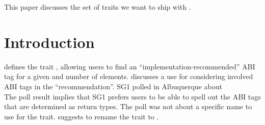 \newcommand\wgTitle{Finding the right set of traits for \code{simd<T>}}
\newcommand\wgName{Matthias Kretz <m.kretz@gsi.de>}
\newcommand\wgDocumentNumber{P0964R0}
\newcommand\wgGroup{SG1, LEWG}

\usepackage{mymacros}
\usepackage{wg21}
\usepackage{underscore}



\newcommand\simd[1][]{\type{simd#1}\xspace}
\newcommand\simdT{\type{simd<T>}\xspace}
\newcommand\valuetype{\type{value\_type}\xspace}
\newcommand\referencetype{\type{reference}\xspace}
\newcommand\whereexpression{\type{where\_expression}\xspace}
\newcommand\simdcast{\code{simd\_cast}\xspace}
\newcommand\mask[1][]{\type{simd\_mask#1}\xspace}
\newcommand\maskT{\type{simd\_mask<T>}\xspace}
\newcommand\fixedsizeN{\type{simd\_abi::fixed\_size<N>}\xspace}
\newcommand\fixedsizescoped{\type{simd\_abi::fixed\_size}\xspace}
\newcommand\fixedsize{\type{fixed\_size}\xspace}
\newcommand\simdEP{\code{execution::}\type{simd}\xspace}
\newcommand\seqEP{\code{execution::}\type{seq}\xspace}
\newcommand\realArithmeticType{vectorizable type\xspace}

\usepackage{pifont}

\newcommand\foralli[1][]{for all \code i $\in$ \code{[0, #1size())}\xspace}
\newcommand\forallmaskedi[1]{%
  for all \code i
  $\in \{j \in \mathbb{N}_0 | j < \code{size()} ⋀ \code{#1[}j\code{]}\}$%
  \xspace%
}
\newcommand\chck{\item[\color{black}\ensuremath{\checkmark}]}
\newcommand\todo{\item[\color{black}\ding{46}] \color{gray}}
\newcommand\itemheader[1]{\item[] \hfill \textcolor{gray}{\textsc{#1}}}


\begin{wgTitlepage}
  This paper discusses the set of traits we want to ship with \simdT.
\end{wgTitlepage}

\pagestyle{scrheadings}
\section{Introduction}
\textcite{P0214R8} defines the trait , allowing users to find an “implementation-recommended” ABI tag for a given \valuetype and number of elements.
\textcite{P0820R1} discusses a use for considering involved ABI tags in the “recommendation”.
SG1 polled in Albuquerque about\\
\noindent The poll result implies that SG1 prefers users to be able to spell out the ABI tags that are determined as return types.
The poll was not about a specific name to use for the trait.
\textcite{P0820R1} suggests to rename the trait to .

